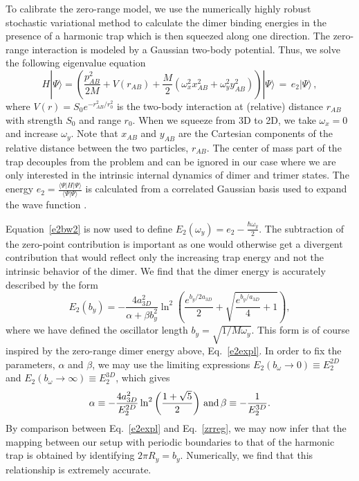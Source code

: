 \documentclass[twocolumn,showpacs,aps,prl,10pt]{revtex4}
\begin{document}
To calibrate the zero-range model, we use the numerically highly robust stochastic 
variational method to calculate the dimer binding energies in the presence of 
a harmonic trap which is then squeezed along one direction. The zero-range 
interaction is modeled by a Gaussian two-body potential. 
Thus, we solve the following eigenvalue equation
\begin{equation}
H|\Psi\rangle=\left(\frac{p_{AB}^{2}}{2M}
+V(r_{AB})+\frac{M}{2}\left(\omega_{x}^{2} x_{AB}^{2}+\omega_{y}^{2} y_{AB}^{2}\right)\right)|\Psi\rangle\,=\,
e_2|\Psi\rangle \, , \label{e2bw2} 
\end{equation}
where $V(r)=S_0e^{-r_{AB}^{2}/r_{0}^{2}}$ is the two-body interaction at (relative) distance $r_{AB}$ with
strength $S_0$ and range $r_0$. When we squeeze from 3D to 2D, we take $\omega_x=0$ and increase $\omega_y$. 
Note that $x_{AB}$ and $y_{AB}$ are the Cartesian components of the relative distance between the 
two particles, $r_{AB}$. The center of mass part of the trap decouples from the problem and can be 
ignored in our case where we are only interested in the intrinsic internal dynamics of dimer
and trimer states. The energy 
$e_2=\frac{\langle\Psi|H|\Psi\rangle}{\langle\Psi|\Psi\rangle}$ is calculated from a correlated 
Gaussian basis used to expand the wave function \cite{suzuki}.


Equation~\eqref{e2bw2} is now used to define $E_2(\omega_y)= e_2-\frac{\hbar\omega_y}{2}$. The
subtraction of the zero-point contribution is important as one would otherwise get
a divergent contribution that would reflect only the increasing trap energy and not 
the intrinsic behavior of the dimer. We find that the dimer energy is accurately 
described by the form 
\begin{equation}
E_2(b_y)=- \frac{4a_{3D}^{2}}{\alpha+\beta b_{y}^2}\ln^2
\left(\frac{e ^{b_y/2a_{3D}}}{2}+\sqrt{\frac{e ^{b_y/a_{3D}}}{4}+1}\right),
\label{zrreg}
\end{equation}
where we have defined the oscillator length $b_y=\sqrt{1/M\omega_y}$. This form 
is of course inspired by the zero-range dimer energy above, Eq.~\eqref{e2expl}.
In order to fix the parameters, $\alpha$ and $\beta$, we may use the limiting 
expressions $E_2(b_\omega\to0)\equiv E_2^{2D}$ and $E_2(b_\omega\to\infty)\equiv E_2^{3D}$, 
which gives 
\begin{equation}
\alpha\equiv-\frac{4a_{3D}^{2}}{E_2^{2D}}\ln^2\left(\frac{1+\sqrt{5}}{2}\right) \,{\rm and}\, 
\beta\equiv-\frac{1}{E_2^{3D}}.
\end{equation}
By comparison between Eq.~\eqref{e2expl} and Eq.~\eqref{zrreg}, we may now infer that 
the mapping between our setup with periodic boundaries to that of the harmonic 
trap is obtained by identifying $2\pi R_y=b_y$. Numerically, we find that this 
relationship is extremely accurate. 
\end{document}
